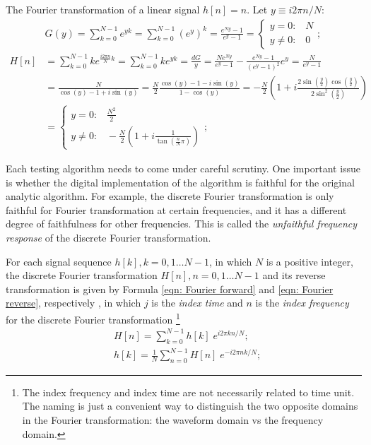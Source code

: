 \documentclass[twoside]{article}
\numberwithin{equation}{section}
\newcommand{\eqspace}{\;\;\;}
\begin{document}
The Fourier transformation of a linear signal $h[n] = n$. 
Let $y \equiv i 2\pi n /N$:
\begin{align*}
& G(y) = \sum_{k=0}^{N-1}  e^{y k} = \sum_{k=0}^{N-1}  (e^y)^k = \frac{e^{N y} - 1}{e^y - 1}
 = \begin{cases} y = 0: \eqspace N \\ y \neq 0: \eqspace 0 \end{cases}; \\
H[n] &= \sum_{k=0}^{N-1} k e^{\frac{i 2\pi n}{N} k} = \sum_{k=0}^{N-1} k e^{y k} 
 = \frac{d G}{y} = \frac{N e^{N y}}{e^y - 1} - \frac{e^{N y} - 1}{(e^y - 1)^2} e^y = \frac{N}{e^y - 1} \\
 &= \frac{N}{\cos(y) - 1 + i \sin(y)} = \frac{N}{2} \frac{\cos(y) - 1 -  i \sin(y)}{1 - \cos(y)} 
  = - \frac{N}{2}(1 + i \frac{2 \sin(\frac{y}{2}) \cos(\frac{y}{2})}{2 \sin^2(\frac{y}{2})}) \\
 &= \begin{cases} y = 0: \eqspace \frac{N^2}{2} \\ y \neq 0: \eqspace - \frac{N}{2}(1 + i \frac{1}{\tan(\frac{n}{N} \pi)}) \end{cases};
\end{align*}

\fi


Each testing algorithm needs to come under careful scrutiny.  
One important issue is whether the digital implementation of the algorithm is faithful for the original analytic algorithm.  
For example, the discrete Fourier transformation is only faithful for Fourier transformation at certain frequencies, and it has a different degree of faithfulness for other frequencies.  
This is called the \emph{unfaithful frequency response} of the discrete Fourier transformation.

For each signal sequence $h[k], k = 0, 1 \dots  N-1$, in which $N$ is a positive integer, the discrete Fourier transformation $H[n], n = 0, 1 \dots  N-1$ and its reverse transformation is given by Formula \eqref{eqn: Fourier forward} and \eqref{eqn: Fourier reverse}, respectively  \cite{Numerical_Recipes}, in which $j$ is the \emph{index time} and $n$ is the \emph{index frequency} for the discrete Fourier transformation
\footnote{The index frequency and index time are not necessarily related to time unit.  
The naming is just a convenient way to distinguish the two opposite domains in the Fourier transformation: the waveform domain vs the frequency domain.}
\begin{align}
\label{eqn: Fourier forward}
& H[n]=\sum_{k=0}^{N-1} h[k] \; e^{i 2\pi k n/N}; \\
\label{eqn: Fourier reverse}
& h[k]=\frac{1}{N} \sum_{n=0}^{N-1} H[n] \; e^{-i 2\pi n k/N};
\end{align}
\end{document}
